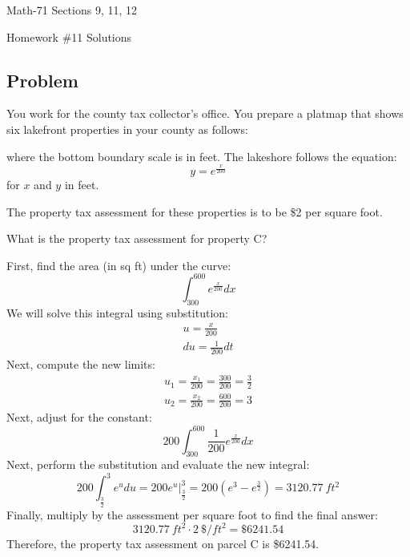 \documentclass[letterpaper,12pt,fleqn]{article}
\begin{document}
\begin{center}
  \large
  Math-71 Sections 9, 11, 12

  \Large
  Homework \#11 Solutions
\end{center}

\subsection*{Problem}

You work for the county tax collector's office.  You prepare a platmap that shows six lakefront properties in your
county as follows:

\bigskip


\bigskip

where the bottom boundary scale is in feet.  The lakeshore follows the equation:
\[y=e^{\frac{x}{200}}\]
for \(x\) and \(y\) in feet.

The property tax assessment for these properties is to be \$2 per square foot.

What is the property tax assessment for property C?

First, find the area (in sq ft) under the curve:
\[\int_{300}^{600}e^{\frac{x}{200}}dx\]
We will solve this integral using substitution:
\begin{gather*}
  u=\frac{x}{200} \\
  du=\frac{1}{200}dt
\end{gather*}
Next, compute the new limits:
\begin{gather*}
  u_1=\frac{x_1}{200}=\frac{300}{200}=\frac{3}{2} \\
  u_2=\frac{x_2}{200}=\frac{600}{200}=3
\end{gather*}
Next, adjust for the constant:
\[200\int_{300}^{600}\frac{1}{200}e^{\frac{x}{200}}dx\]
Next, perform the substitution and evaluate the new integral:
\[200\int_{\frac{3}{2}}^3e^udu=200\left.e^u\right|_{\frac{3}{2}}^3=200\left(e^3-e^{\frac{3}{2}}\right)=\SI{3120.77}{ft^2}\]
Finally, multiply by the assessment per square foot to find the final answer:
\[\SI{3120.77}{ft^2}\cdot\SI{2}{\$/ft^2}=\$6241.54\]
Therefore, the property tax assessment on parcel C is \$6241.54.
\end{document}
